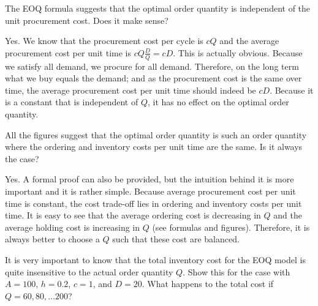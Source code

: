 \begin{question}
The EOQ formula suggests that the optimal order quantity is independent of the unit procurement cost. Does it make sense?
\end{question}

\begin{solution}
Yes. We know that the procurement cost per cycle is $cQ$ and the average procurement cost per unit time is $cQ\frac{D}{Q}=cD$. This is actually obvious. Because we satisfy all demand, we procure for all demand. Therefore, on the long term what we buy equals the demand; and as the procurement cost is the same over time, the average procurement cost per unit time should indeed be $cD$. Because it is a constant that is independent of $Q$, it has no effect on the optimal order quantity.
\end{solution}

\begin{question}
All the figures suggest that the optimal order quantity is such an order quantity where the ordering and inventory costs per unit time are the same. Is it always the case?
\end{question}

\begin{solution}
Yes. A formal proof can also be provided, but the intuition behind it is more important and it is rather simple. Because average procurement cost per unit time is constant, the cost trade-off lies in ordering and inventory costs per unit time. It is easy to see that the average ordering cost is decreasing in $Q$ and the average holding cost is increasing in $Q$ (see formulas and figures). Therefore, it is always better to choose a $Q$ such that these cost are balanced.
\end{solution}

\begin{question}
  It is very important to know that the total inventory cost for
  the EOQ model is quite insensitive to the actual order quantity
  $Q$. Show this for the case with $A=100$, $h=0.2$, $c=1$, and $D=20$. What
  happens to the total cost if $Q=60, 80, \ldots 200$?
\end{question}

